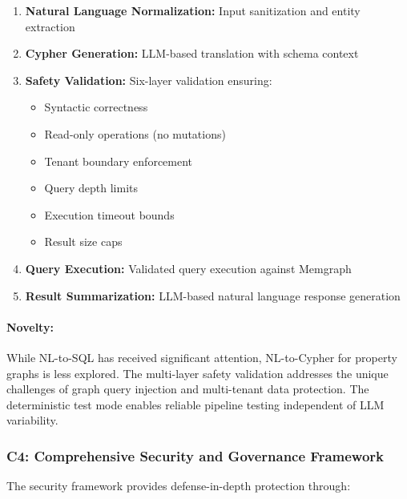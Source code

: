 \begin{enumerate}
    \item \textbf{Natural Language Normalization:} Input sanitization and entity extraction
    \item \textbf{Cypher Generation:} LLM-based translation with schema context
    \item \textbf{Safety Validation:} Six-layer validation ensuring:
    \begin{itemize}
        \item Syntactic correctness
        \item Read-only operations (no mutations)
        \item Tenant boundary enforcement
        \item Query depth limits
        \item Execution timeout bounds
        \item Result size caps
    \end{itemize}
    \item \textbf{Query Execution:} Validated query execution against Memgraph
    \item \textbf{Result Summarization:} LLM-based natural language response generation
\end{enumerate}

\paragraph{Novelty:} While NL-to-SQL has received significant attention, NL-to-Cypher for property graphs is less explored. The multi-layer safety validation addresses the unique challenges of graph query injection and multi-tenant data protection. The deterministic test mode enables reliable pipeline testing independent of LLM variability.

\subsubsection{C4: Comprehensive Security and Governance Framework}

The security framework provides defense-in-depth protection through:

